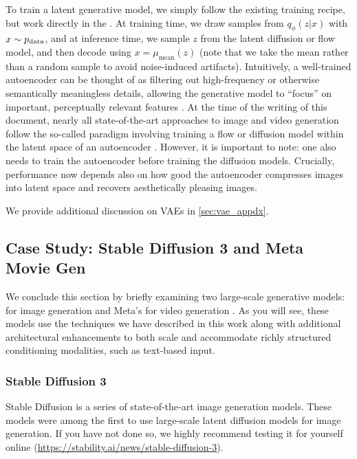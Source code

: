 \begin{remarkbox}
To train a latent generative model, we simply follow the existing training recipe, but work directly in the . At training time, we draw samples from $q_\phi(z|x)$ with $x \sim p_{\rm{data}}$, and at inference time, we sample $z$ from the latent diffusion or flow model, and then decode using $x = \mu_\text{mean}(z)$ (note that we take the mean rather than a random sample to avoid noise-induced artifacts). Intuitively, a well-trained autoencoder can be thought of as filtering out high-frequency or otherwise semantically meaningless details, allowing the generative model to ``focus'' on important, perceptually relevant features \cite{latent_diffusion}. At the time of the writing of this document, nearly all state-of-the-art approaches to image and video generation follow the so-called  paradigm involving training a flow or diffusion model within the latent space of an autoencoder \citep{latent_diffusion,vahdat2021score}. However, it is important to note: one also needs to train the autoencoder before training the diffusion models. Crucially, performance now depends also on how good the autoencoder compresses images into latent space and recovers aesthetically pleasing images.
\end{remarkbox}
We provide additional discussion on VAEs in \cref{sec:vae_appdx}.

\subsection{Case Study: Stable Diffusion 3 and Meta Movie Gen}
\label{sec:large_scale_models}
We conclude this section by briefly examining two large-scale generative models:  for image generation and Meta's  for video generation \citep{sd3, moviegen}. As you will see, these models use the techniques we have described in this work along with additional architectural enhancements to both scale and accommodate richly structured conditioning modalities, such as text-based input.

\subsubsection{Stable Diffusion 3}

Stable Diffusion is a series of state-of-the-art image generation models. These models were among the first to use large-scale latent diffusion models for image generation. If you have not done so, we highly recommend testing it for yourself online (\url{https://stability.ai/news/stable-diffusion-3}).\\

